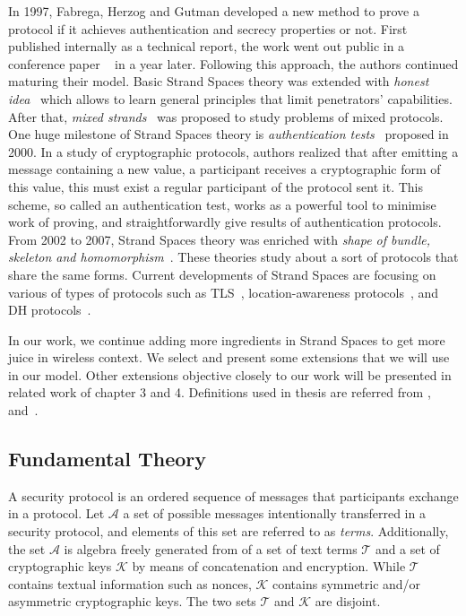 In 1997, Fabrega, Herzog and Gutman developed a new method to prove a protocol if it achieves authentication and secrecy properties or not. First published internally as a technical report, the work went out public in a conference paper ~\cite{674832} in a year later. Following this approach, the authors continued maturing their model. Basic Strand Spaces theory was extended with \emph{honest idea}~\cite{Thayer:1998:HIS:794198.795096} which allows to learn general principles that limit penetrators' capabilities. After that, \emph{mixed strands}~\cite{Thayer:1999:MSS:794199.795113} was proposed to study problems of mixed protocols. One huge milestone of Strand Spaces theory is \emph{authentication tests}~\cite{Guttman:2002:ATS:568264.568267} proposed in 2000. In a study of cryptographic protocols, authors realized that after emitting a message containing a new value, a participant receives a cryptographic form of this value, this must exist a regular participant of the protocol sent it. This scheme, so called an authentication test, works as a powerful tool to minimise work of proving, and straightforwardly give results of authentication protocols. From 2002 to 2007, Strand Spaces theory was enriched with \emph{shape of bundle, skeleton and homomorphism}~\cite{Doghmi:2007:SHS:1230146.1230260}. These theories study about a sort of protocols that share the same forms. Current developments of Strand Spaces are focusing on various of types of protocols such as TLS~\cite{Kamil:2011:ATS:2590701.2590707}, location-awareness protocols~\cite{Thayer:2010aa}, and DH protocols~\cite{1212716}. 

In our work, we continue adding more ingredients in Strand Spaces to get more juice in wireless context. We select and present some extensions that we will use in our model. Other extensions objective closely to our work will be presented in related work of chapter 3 and 4. Definitions used in thesis are referred from \cite{674832}, \cite{Guttman:2002:ATS:568264.568267} and~\cite{Doghmi:2007:SHS:1230146.1230260}. 

\subsection{Fundamental Theory}

A security protocol is an ordered sequence of messages that participants exchange in a protocol. Let $\mathcal{A}$ a set of possible messages intentionally transferred in a security protocol, and elements of this set are referred to as \textit{terms}. Additionally, the set $\mathcal{A}$ is algebra freely generated from of a set of text terms $\mathcal{T}$ and a set of cryptographic keys $\mathcal{K}$ by means of concatenation and encryption. While $\mathcal{T}$ contains textual information such as nonces, $\mathcal{K}$ contains symmetric and/or asymmetric cryptographic keys. The two sets $\mathcal{T}$ and $\mathcal{K}$ are disjoint. 

